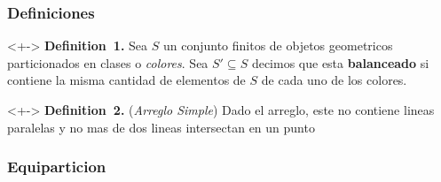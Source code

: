 \documentclass[xcolor=table]{beamer}
\begin{document}
\begin{mdframe}
\begin{mdtoc}
\begin{mdtocblock}


\end{mdtocblock}%
\end{mdtoc}%
\end{mdframe}\label{sec-contenido}%

\begin{mdframe}%

\frametitle{Definiciones}\label{heading-sec-definiciones}%

\begin{mdbmarginx}{1ex}{0pt}{1ex}{0pt}%
\begin{onlyenv}<+->%
\noindent{}\textbf{Definition~1.} \mdbr
{}  Sea $S$ un conjunto finitos de objetos geometricos particionados en clases o \emph{colores}.
  Sea $S'\subseteq S$ decimos que esta \textbf{balanceado} si contiene la misma cantidad de elementos
  de $S$ de cada uno de los colores.%
\end{onlyenv}%
\end{mdbmarginx}%

\begin{mdbmarginx}{1ex}{0pt}{1ex}{0pt}%
\begin{onlyenv}<+->%
\noindent{}\textbf{Definition~2.} ({\itshape Arreglo Simple})\mdbr
{}  Dado el arreglo, este no contiene lineas paralelas y no mas de dos lineas intersectan
  en un punto%
\end{onlyenv}%
\end{mdbmarginx}%
\end{mdframe}\label{sec-definiciones}%

\begin{mdframe}%

\frametitle{Equiparticion}\label{heading-sec-equiparticion}%
\end{mdframe}\label{sec-equiparticion}%
\end{document}
